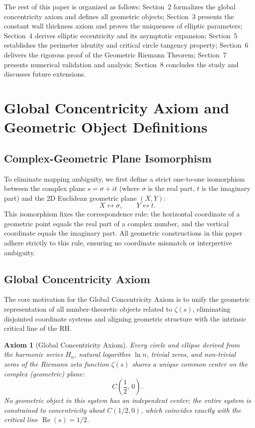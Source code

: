 \documentclass[12pt,a4paper]{article}
\newtheorem{axiom}{Axiom}
\theoremstyle{definition}
\begin{document}
The rest of this paper is organized as follows: Section~2 formalizes the global concentricity axiom and defines all geometric objects; Section~3 presents the constant wall thickness axiom and proves the uniqueness of elliptic parameters; Section~4 derives elliptic eccentricity and its asymptotic expansion; Section~5 establishes the perimeter identity and critical circle tangency property; Section~6 delivers the rigorous proof of the Geometric Riemann Theorem; Section~7 presents numerical validation and analysis; Section~8 concludes the study and discusses future extensions.

\section{Global Concentricity Axiom and Geometric Object Definitions}
\label{sec:concentric}

\subsection{Complex-Geometric Plane Isomorphism}
To eliminate mapping ambiguity, we first define a strict one-to-one isomorphism between the complex plane $s = \sigma + it$ (where $\sigma$ is the real part, $t$ is the imaginary part) and the 2D Euclidean geometric plane $(X, Y)$:
\[
X \leftrightarrow \sigma, \qquad Y \leftrightarrow t.
\]
This isomorphism fixes the correspondence rule: the horizontal coordinate of a geometric point equals the real part of a complex number, and the vertical coordinate equals the imaginary part. All geometric constructions in this paper adhere strictly to this rule, ensuring no coordinate mismatch or interpretive ambiguity.

\subsection{Global Concentricity Axiom}
The core motivation for the Global Concentricity Axiom is to unify the geometric representation of all number-theoretic objects related to $\zeta(s)$, eliminating disjointed coordinate systems and aligning geometric structure with the intrinsic critical line of the RH.

\begin{axiom}[Global Concentricity Axiom]
\label{axiom:concentric}
Every circle and ellipse derived from the harmonic series $H_n$, natural logarithm $\ln n$, trivial zeros, and non-trivial zeros of the Riemann zeta function $\zeta(s)$ shares a unique common center on the complex (geometric) plane:
\[
C\!\left(\frac{1}{2},\,0\right).
\]
No geometric object in this system has an independent center; the entire system is constrained to concentricity about $C(1/2,0)$, which coincides exactly with the critical line $\operatorname{Re}(s)=1/2$.
\end{axiom}
\end{document}
